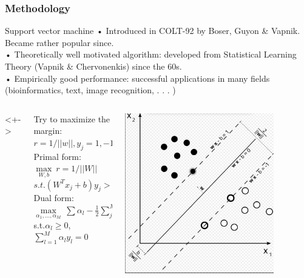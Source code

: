 \documentclass[xcolor={x11names,svgnames,dvipsnames}]{beamer}
\begin{document}
\begin{frame}
\frametitle{Methodology}
\begin{block}{Support vector machine}
{\small
• Introduced in COLT-92 by Boser, Guyon \& Vapnik. Became
rather popular since.\\
• Theoretically well motivated algorithm: developed from Statistical
Learning Theory (Vapnik \& Chervonenkis) since the 60s.\\
• Empirically good performance: successful applications in many
fields (bioinformatics, text, image recognition, . . . )\\
}
\end{block}

\begin{columns}<+->
\begin{column}{0.6\textwidth}
\small {
Try to maximize the margin:\\ 
$r=1/||w||,y_j=1,-1$\\
Primal form:\\
$\max\limits_{W,b}\ r= 1/||W||$\\
$s.t.(W^Tx_j+b)y_j>=1$\\
Dual form:\\
$\max\limits_{\alpha_1,...,\alpha_M}\ \sum\alpha_l-\frac{1}{2}\sum_{j=1}^{M}\sum_{k=1}^{M}\alpha_j\alpha_k y_j y_k<X_j,X_k>$\\
s.t.$\alpha_l\geq 0$, $\sum_{l=1}^{M}\alpha_ly_l=0$
}
\end{column}
\begin{column}{.4\textwidth}
     \includegraphics[width=0.8\textwidth, height=0.4\textheight]{svm.png}
\end{column}
\end{columns}
\end{frame}
\end{document}
